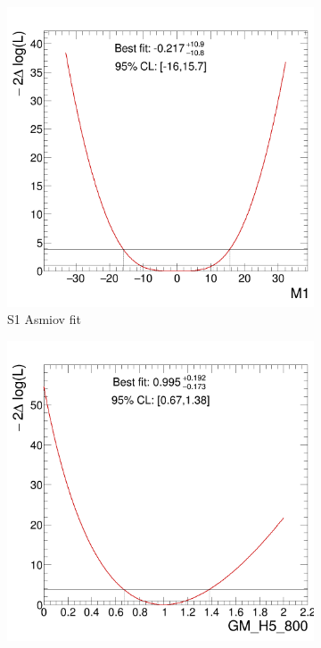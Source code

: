 \documentclass[../Bachelorarbeit.tex]{subfiles}
\begin{document}
\begin{figure}[h]
    \centering
    \begin{subfigure}{0.3\textwidth}
        \includegraphics[width=\textwidth]{Plots/operators/WZ_asimov_final/MWZ/c_scan_M1.png}
        \caption{S1 Asmiov fit}
    \end{subfigure}
    \begin{subfigure}{0.3\textwidth}
        \includegraphics[width=\textwidth]{Plots/operators/GM_H5_MWZ_2022-04-19/GMcoef/GM_H5_800/c_scan_GM_H5_800.png}

\end{subfigure}
\end{figure}
\end{document}
